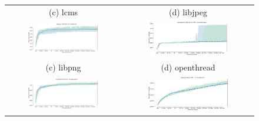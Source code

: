 \begin{figure}[t]
{\begin{tabular}{cc}
            (c) lcms                                                                                                       & (d) libjpeg                                                                                                          \\[6pt]
            \includegraphics[width=0.65\textwidth]{assets/fuzzbench/symptr-25-vs-35-2/libpng-1.2.56_coverage_growth.png}   & \includegraphics[width=0.65\textwidth]{assets/fuzzbench/symptr-25-vs-35-2/openthread-2019-12-23_coverage_growth.png} \\
            (c) libpng                                                                                                     & (d) openthread                                                                                                       \\[6pt]
            \includegraphics[width=0.65\textwidth]{assets/fuzzbench/symptr-25-vs-35-2/re2-2014-12-09_coverage_growth.png}  & \includegraphics[width=0.65\textwidth]{assets/fuzzbench/symptr-25-vs-35-2/sqlite3_ossfuzz_coverage_growth.png}       \\

\end{tabular}}
\end{figure}
